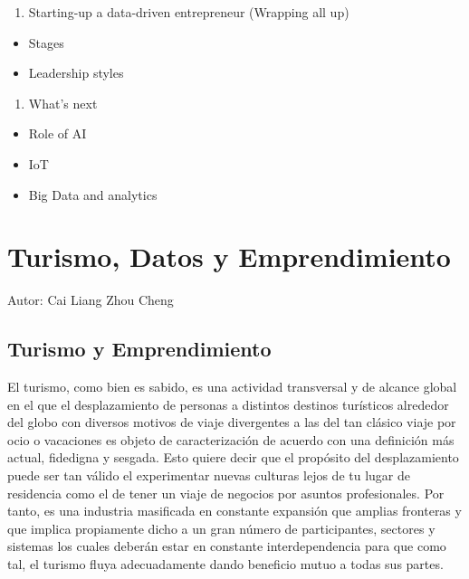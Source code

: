 \documentclass[
  letterpaper,
  DIV=11,
  numbers=noendperiod]{scrreprt}
\providecommand{\tightlist}{%
  \setlength{\itemsep}{0pt}\setlength{\parskip}{0pt}}\usepackage{longtable,booktabs,array}
\begin{document}
\begin{enumerate}
\def\labelenumi{\arabic{enumi}.}
\setcounter{enumi}{5}
\tightlist
\item
  Starting-up a data-driven entrepreneur (Wrapping all up)
\end{enumerate}

\begin{itemize}
\tightlist
\item
  Stages
\item
  Leadership styles
\end{itemize}

\begin{enumerate}
\def\labelenumi{\arabic{enumi}.}
\setcounter{enumi}{6}
\tightlist
\item
  What's next
\end{enumerate}

\begin{itemize}
\tightlist
\item
  Role of AI
\item
  IoT
\item
  Big Data and analytics
\end{itemize}


\hypertarget{turismo-datos-y-emprendimiento}{%
\chapter{Turismo, Datos y
Emprendimiento}\label{turismo-datos-y-emprendimiento}}

Autor: Cai Liang Zhou Cheng

\hypertarget{turismo-y-emprendimiento}{%
\section{Turismo y Emprendimiento}\label{turismo-y-emprendimiento}}

El turismo, como bien es sabido, es una actividad transversal y de
alcance global en el que el desplazamiento de personas a distintos
destinos turísticos alrededor del globo con diversos motivos de viaje
divergentes a las del tan clásico viaje por ocio o vacaciones es objeto
de caracterización de acuerdo con una definición más actual, fidedigna y
sesgada. Esto quiere decir que el propósito del desplazamiento puede ser
tan válido el experimentar nuevas culturas lejos de tu lugar de
residencia como el de tener un viaje de negocios por asuntos
profesionales. Por tanto, es una industria masificada en constante
expansión que amplias fronteras y que implica propiamente dicho a un
gran número de participantes, sectores y sistemas los cuales deberán
estar en constante interdependencia para que como tal, el turismo fluya
adecuadamente dando beneficio mutuo a todas sus partes.
\end{document}
